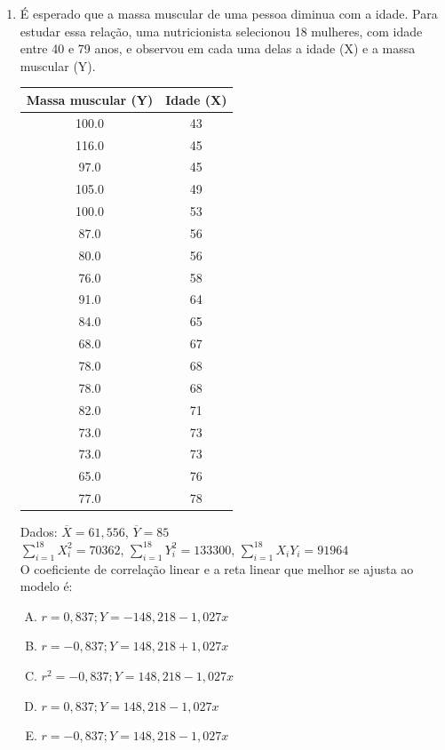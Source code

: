 \documentclass[12pt, a4paper]{article}
\begin{document}
\begin{enumerate}
\item É esperado que a massa muscular de uma pessoa diminua com a idade. Para estudar essa relação, uma nutricionista selecionou 18 mulheres, com idade entre 40 e 79 anos, e observou em cada uma delas a idade (X) e a massa muscular (Y).
\begin{center}
\begin{tabular}{|c|c|}
\hline
\textbf{Massa muscular (Y)} & \textbf{Idade (X)} \\
\hline
100.0 & 43 \\
116.0 & 45 \\
97.0 & 45 \\
105.0 & 49 \\
100.0 & 53 \\
87.0 & 56 \\
80.0 & 56 \\
76.0 & 58 \\
91.0 & 64 \\
84.0 & 65 \\
68.0 & 67 \\
78.0 & 68 \\
78.0 & 68 \\
82.0 & 71 \\
73.0 & 73 \\
73.0 & 73 \\
65.0 & 76 \\
77.0 & 78 \\
\hline
\end{tabular}
\end{center}
Dados: $\overline{X}=61,556$, $\overline{Y}=85$\\
$\sum_{i=1}^{18}X_{i}^{2}=70362$, $\sum_{i=1}^{18}Y_{i}^{2}=133300$, $\sum_{i=1}^{18}X_{i}Y_{i}=91964$\\
O coeficiente de correlação linear e a reta linear que melhor se ajusta ao modelo é:
\begin{enumerate}[A)]
    \item $r=0,837; Y=-148,218-1,027x$
    \item $r=-0,837; Y=148,218+1,027x$
    \item $r^{2}=-0,837; Y=148,218-1,027x$
    \item $r=0,837; Y=148,218-1,027x$
    \item $r=-0,837; Y=148,218-1,027x$
\end{enumerate}


\end{enumerate}
\end{document}
